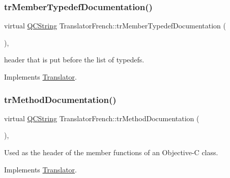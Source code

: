 \mbox{\label{class_translator_french_ae230274d66da6e7a53a2e221e381c890}} 
\subsubsection{\texorpdfstring{trMemberTypedefDocumentation()}{trMemberTypedefDocumentation()}}
{\footnotesize\ttfamily virtual \mbox{\hyperlink{class_q_c_string}{Q\+C\+String}} Translator\+French\+::tr\+Member\+Typedef\+Documentation (\begin{DoxyParamCaption}{ }\end{DoxyParamCaption})\hspace{0.3cm}{\ttfamily [inline]}, {\ttfamily [virtual]}}

header that is put before the list of typedefs. 

Implements \mbox{\hyperlink{class_translator}{Translator}}.

\mbox{\label{class_translator_french_a45ebe4f228d76abe27e9af2263b0e95a}} 
\subsubsection{\texorpdfstring{trMethodDocumentation()}{trMethodDocumentation()}}
{\footnotesize\ttfamily virtual \mbox{\hyperlink{class_q_c_string}{Q\+C\+String}} Translator\+French\+::tr\+Method\+Documentation (\begin{DoxyParamCaption}{ }\end{DoxyParamCaption})\hspace{0.3cm}{\ttfamily [inline]}, {\ttfamily [virtual]}}

Used as the header of the member functions of an Objective-\/C class. 

Implements \mbox{\hyperlink{class_translator}{Translator}}.

\mbox{\label{class_translator_french_af57530560bede93f06e08d10b9224220}} 
